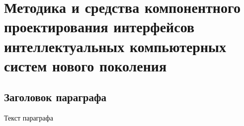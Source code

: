 
\chapter{Методика и средства компонентного проектирования интерфейсов интеллектуальных компьютерных систем нового поколения}
\label{chapter_ui_design}


\section{Заголовок параграфа}
Текст параграфа

%